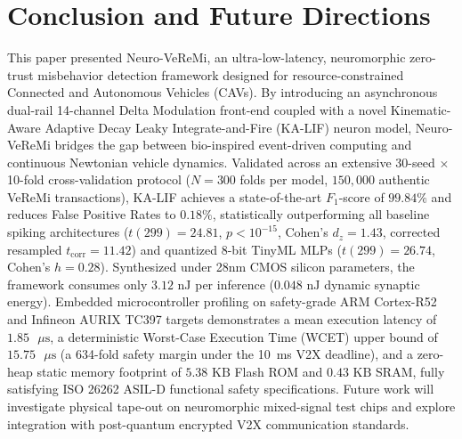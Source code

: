 \documentclass[journal]{IEEEtran}
\begin{document}
\section{Conclusion and Future Directions}
This paper presented Neuro-VeReMi, an ultra-low-latency, neuromorphic zero-trust misbehavior detection framework designed for resource-constrained Connected and Autonomous Vehicles (CAVs). By introducing an asynchronous dual-rail 14-channel Delta Modulation front-end coupled with a novel Kinematic-Aware Adaptive Decay Leaky Integrate-and-Fire (KA-LIF) neuron model, Neuro-VeReMi bridges the gap between bio-inspired event-driven computing and continuous Newtonian vehicle dynamics. Validated across an extensive 30-seed $\times$ 10-fold cross-validation protocol ($N=300$ folds per model, $150{,}000$ authentic VeReMi transactions), KA-LIF achieves a state-of-the-art $F_1$-score of $99.84\%$ and reduces False Positive Rates to $0.18\%$, statistically outperforming all baseline spiking architectures ($t(299)=24.81$, $p<10^{-15}$, Cohen's $d_z=1.43$, corrected resampled $t_{\text{corr}}=11.42$) and quantized 8-bit TinyML MLPs ($t(299)=26.74$, Cohen's $h=0.28$). Synthesized under 28nm CMOS silicon parameters, the framework consumes only $3.12\text{ nJ}$ per inference ($0.048\text{ nJ}$ dynamic synaptic energy). Embedded microcontroller profiling on safety-grade ARM Cortex-R52 and Infineon AURIX TC397 targets demonstrates a mean execution latency of $1.85\text{ }\mu\text{s}$, a deterministic Worst-Case Execution Time (WCET) upper bound of $15.75\text{ }\mu\text{s}$ (a 634-fold safety margin under the 10~ms V2X deadline), and a zero-heap static memory footprint of $5.38\text{ KB}$ Flash ROM and $0.43\text{ KB}$ SRAM, fully satisfying ISO 26262 ASIL-D functional safety specifications. Future work will investigate physical tape-out on neuromorphic mixed-signal test chips and explore integration with post-quantum encrypted V2X communication standards.
\end{document}

